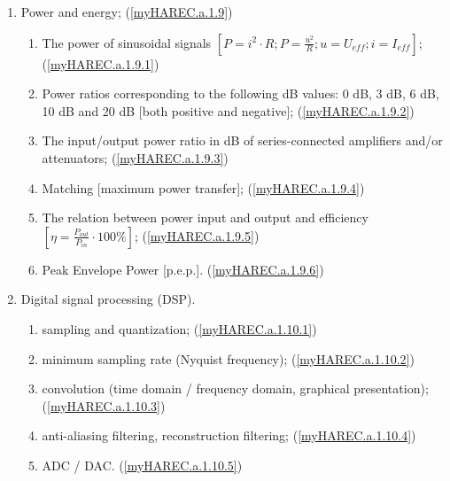 \begin{enumerate}
\begin{enumerate}[noitemsep]
\item Power and energy; (\ref{myHAREC.a.1.9})\label{HAREC.a.1.9}
\begin{enumerate}[noitemsep]
\item The power of sinusoidal signals \(\left[P=i^2 \cdot R; P=\frac{u^2}{R}; u=U_{eff}; i=I_{eff}\right]\); (\ref{myHAREC.a.1.9.1})\label{HAREC.a.1.9.1}
\item Power ratios corresponding to the following dB values: 0 dB, 3 dB, 6 dB, 10 dB and 20 dB [both positive and negative]; (\ref{myHAREC.a.1.9.2})\label{HAREC.a.1.9.2}
\item The input/output power ratio in dB of series-connected amplifiers and/or attenuators; (\ref{myHAREC.a.1.9.3})\label{HAREC.a.1.9.3}
\item Matching [maximum power transfer]; (\ref{myHAREC.a.1.9.4})\label{HAREC.a.1.9.4}
\item The relation between power input and output and efficiency \(\left[\eta=\frac{P_{out}}{P_{in}}\cdot 100\%\right]\); (\ref{myHAREC.a.1.9.5})\label{HAREC.a.1.9.5}
\item Peak Envelope Power [p.e.p.]. (\ref{myHAREC.a.1.9.6})\label{HAREC.a.1.9.6}
\end{enumerate}

\item Digital signal processing (DSP).
\begin{enumerate}[noitemsep]
\item sampling and quantization; (\ref{myHAREC.a.1.10.1})\label{HAREC.a.1.10.1}
\item minimum sampling rate (Nyquist frequency); (\ref{myHAREC.a.1.10.2})\label{HAREC.a.1.10.2}
\item convolution (time domain / frequency domain, graphical presentation); (\ref{myHAREC.a.1.10.3})\label{HAREC.a.1.10.3}
\item anti-aliasing filtering, reconstruction filtering; (\ref{myHAREC.a.1.10.4})\label{HAREC.a.1.10.4}
\item ADC / DAC. (\ref{myHAREC.a.1.10.5})\label{HAREC.a.1.10.5}
\end{enumerate}

\end{enumerate}


\end{enumerate}
